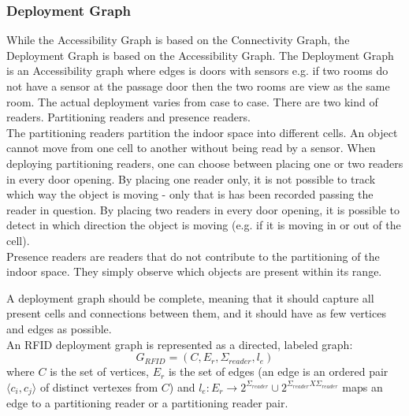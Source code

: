
\subsubsection{ \quad Deployment Graph}
While the Accessibility Graph is based on the Connectivity Graph, the Deployment Graph is based on the Accessibility Graph. 
The Deployment Graph is an Accessibility graph where edges is doors with sensors e.g. if two rooms do not have a sensor at the passage door then the two rooms are view as the same room.
The actual deployment varies from case to case. 
There are two kind of readers. 
Partitioning readers and presence readers. \\

The partitioning readers partition the indoor space into different cells. 
An object cannot move from one cell to another without being read by a sensor. 
When deploying partitioning readers, one can choose between placing one or two readers in every door opening. 
By placing one reader only, it is not possible to track which way the object is moving - only that is has been recorded passing the reader in question. 
By placing two readers in every door opening, it is possible to detect in which direction the object is moving (e.g. if it is moving in or out of the cell). \\

Presence readers are readers that do not contribute to the partitioning of the indoor space. 
They simply observe which objects are present within its range. 

A deployment graph should be complete, meaning that it should capture all present cells and connections between them, and it should have as few vertices and edges as possible. \\
An RFID deployment graph is represented as a directed, labeled graph:
\begin{equation}
G_{RFID} = (C, E_r, \Sigma_{reader}, l_e)
\end{equation} 
where $C$ is the set of vertices, $E_r$ is the set of edges (an edge is an ordered pair $\langle c_i, c_j \rangle$ of distinct vertexes from $C$) and $l_e : E_r \rightarrow 2^{\Sigma_{reader}} \cup 2^{\Sigma_{reader} X \Sigma_{reader}}$ maps an edge to a partitioning reader or a partitioning reader pair. \\


